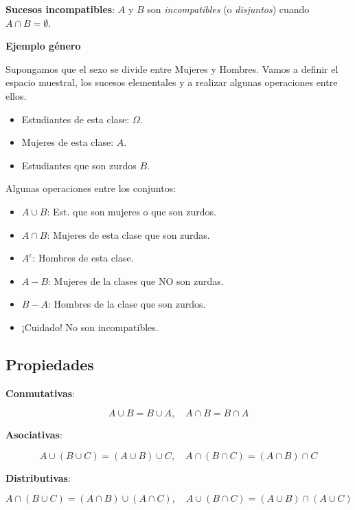 \documentclass[]{book}
\providecommand{\tightlist}{%
  \setlength{\itemsep}{0pt}\setlength{\parskip}{0pt}}
\begin{document}
 \textbf{Sucesos incompatibles}: \(A\) y \(B\) son \emph{incompatibles} (o \emph{disjuntos}) cuando \(A\cap B=\emptyset\).

\textbf{Ejemplo género}

Supongamos que el sexo se divide entre Mujeres y Hombres. Vamos a definir el espacio muestral, los sucesos elementales y a realizar algunas operaciones entre ellos.

\begin{itemize}
\tightlist
\item
  Estudiantes de esta clase: \(\Omega\).
\item
  Mujeres de esta clase: \(A\).
\item
  Estudiantes que son zurdos \(B\).
\end{itemize}

Algunas operaciones entre los conjuntos:

\begin{itemize}
\tightlist
\item
  \(A\cup B\): Est. que son mujeres o que son zurdos.
\item
  \(A\cap B\): Mujeres de esta clase que son zurdas.
\item
  \(A^c\): Hombres de esta clase.
\item
  \(A-B\): Mujeres de la clases que NO son zurdas.
\item
  \(B-A\): Hombres de la clase que son zurdos.
\item
  ¡Cuidado! No son incompatibles.
\end{itemize}

\hypertarget{propiedades}{%
\subsection{Propiedades}\label{propiedades}}

\textbf{Conmutativas}:

\[A\cup B=B\cup A, \quad A\cap B=B\cap A\]

\textbf{Asociativas}:

\[A\cup(B\cup C)=(A\cup B)\cup C, \quad A\cap(B\cap C)=(A\cap B)\cap C\]

\textbf{Distributivas}:

\[A\cap(B\cup C)=(A\cap B)\cup (A\cap C), \quad A\cup(B\cap C)=(A\cup B)\cap (A\cup C)\]
\end{document}
